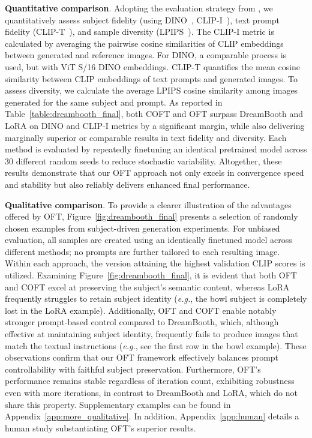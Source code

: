 \textbf{Quantitative comparison}. Adopting the evaluation strategy from \cite{ruiz2023dreambooth}, we quantitatively assess subject fidelity (using DINO~\cite{caron2021emerging}, CLIP-I~\cite{radford2021learning}), text prompt fidelity (CLIP-T~\cite{radford2021learning}), and sample diversity (LPIPS~\cite{zhang2018unreasonable}). The CLIP-I metric is calculated by averaging the pairwise cosine similarities of CLIP embeddings between generated and reference images. For DINO, a comparable process is used, but with ViT S/16 DINO embeddings. CLIP-T quantifies the mean cosine similarity between CLIP embeddings of text prompts and generated images. To assess diversity, we calculate the average LPIPS cosine similarity among images generated for the same subject and prompt. As reported in Table~\ref{table:dreambooth_final}, both COFT and OFT surpass DreamBooth and LoRA on DINO and CLIP-I metrics by a significant margin, while also delivering marginally superior or comparable results in text fidelity and diversity. Each method is evaluated by repeatedly finetuning an identical pretrained model across 30 different random seeds to reduce stochastic variability. Altogether, these results demonstrate that our OFT approach not only excels in convergence speed and stability but also reliably delivers enhanced final performance.

\textbf{Qualitative comparison}. To provide a clearer illustration of the advantages offered by OFT, Figure~\ref{fig:dreambooth_final} presents a selection of randomly chosen examples from subject-driven generation experiments. For unbiased evaluation, all samples are created using an identically finetuned model across different methods; no prompts are further tailored to each resulting image. Within each approach, the version attaining the highest validation CLIP scores is utilized. Examining Figure~\ref{fig:dreambooth_final}, it is evident that both OFT and COFT excel at preserving the subject's semantic content, whereas LoRA frequently struggles to retain subject identity (\emph{e.g.}, the bowl subject is completely lost in the LoRA example). Additionally, OFT and COFT enable notably stronger prompt-based control compared to DreamBooth, which, although effective at maintaining subject identity, frequently fails to produce images that match the textual instructions (\emph{e.g.}, see the first row in the bowl example). These observations confirm that our OFT framework effectively balances prompt controllability with faithful subject preservation. Furthermore, OFT’s performance remains stable regardless of iteration count, exhibiting robustness even with more iterations, in contrast to DreamBooth and LoRA, which do not share this property. Supplementary examples can be found in Appendix~\ref{app:more_qualitative}. In addition, Appendix~\ref{app:human} details a human study substantiating OFT’s superior results.

